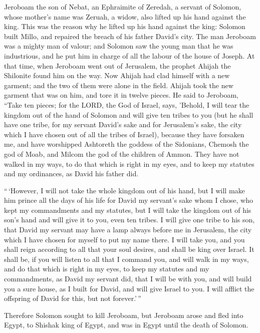  Jeroboam the son of Nebat, an Ephraimite of Zeredah, a
servant of Solomon, whose mother's name was Zeruah, a widow, also lifted
up his hand against the king.  This was the reason why he
lifted up his hand against the king: Solomon built Millo, and repaired
the breach of his father David's city.  The man Jeroboam
was a mighty man of valour; and Solomon saw the young man that he was
industrious, and he put him in charge of all the labour of the house of
Joseph.  At that time, when Jeroboam went out of
Jerusalem, the prophet Ahijah the Shilonite found him on the way. Now
Ahijah had clad himself with a new garment; and the two of them were
alone in the field.  Ahijah took the new garment that was
on him, and tore it in twelve pieces.  He said to
Jeroboam, ``Take ten pieces; for the LORD, the God of Israel, says,
'Behold, I will tear the kingdom out of the hand of Solomon and will
give ten tribes to you  (but he shall have one tribe, for
my servant David's sake and for Jerusalem's sake, the city which I have
chosen out of all the tribes of Israel),  because they
have forsaken me, and have worshipped Ashtoreth the goddess of the
Sidonians, Chemosh the god of Moab, and Milcom the god of the children
of Ammon. They have not walked in my ways, to do that which is right in
my eyes, and to keep my statutes and my ordinances, as David his father
did.

 ``\,`However, I will not take the whole kingdom out of
his hand, but I will make him prince all the days of his life for David
my servant's sake whom I chose, who kept my commandments and my
statutes,  but I will take the kingdom out of his son's
hand and will give it to you, even ten tribes.  I will
give one tribe to his son, that David my servant may have a lamp always
before me in Jerusalem, the city which I have chosen for myself to put
my name there.  I will take you, and you shall reign
according to all that your soul desires, and shall be king over Israel.
 It shall be, if you will listen to all that I command
you, and will walk in my ways, and do that which is right in my eyes, to
keep my statutes and my commandments, as David my servant did, that I
will be with you, and will build you a sure house, as I built for David,
and will give Israel to you.  I will afflict the
offspring of David for this, but not forever.'\,''

 Therefore Solomon sought to kill Jeroboam, but Jeroboam
arose and fled into Egypt, to Shishak king of Egypt, and was in Egypt
until the death of Solomon.

